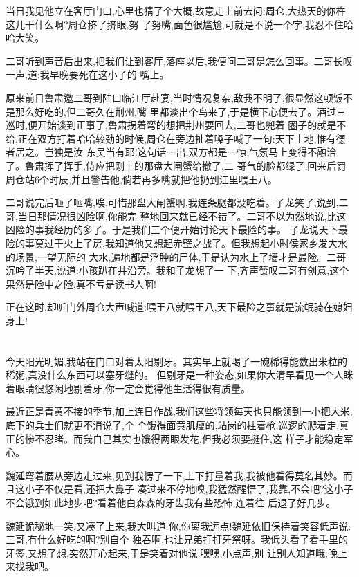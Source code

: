 ﻿\documentclass[12pt,twocolumn]{article}
\begin{document}
当日我见他立在客厅门口,心里也猜了个大概,故意走上前去问:周仓,大热天的你杵这儿干什么啊?周仓挤了挤眼,努
了努嘴,面色很尴尬,可就是不说一个字,我忍不住哈哈大笑。

二哥听到声音后出来,把我们让到客厅,落座以后,我便问二哥是怎么回事。二哥长叹一声,道:我早晚要死在这小子的
嘴上。

原来前日鲁肃邀二哥到陆口临江厅赴宴,当时情况复杂,敌我不明了,很显然这顿饭不是那么好吃的,但二哥久在荆州,嘴
里都淡出个鸟来了,于是横下心便去了。酒过三巡时,便开始谈到正事了,鲁肃拐着弯的想把荆州要回去,二哥也兜着
圈子的就是不给,正在双方打着哈哈较劲的时候,周仓在旁边扯着嗓子喊了一句:天下土地,惟有德者居之。岂独是汝
东吴当有耶!这句话一出,双方都是一惊,气氛马上变得不融洽了。鲁肃挥了挥手,侍应把刚上的那盘大闸蟹给撤了,二
哥气的脸都绿了,回来后罚周仓站6个时辰,并且警告他,倘若再多嘴就把他扔到江里喂王八。

二哥说完后咂了咂嘴,唉,可惜那盘大闸蟹啊,我连条腿都没吃着。子龙笑了,说到,二哥,当日那情况很凶险啊,你能完
整地回来就已经不错了。二哥不以为然地说,比这凶险的事我经历的多了。于是我们三个便开始讨论天下最险的事。
子龙说天下最险的事莫过于火上了房,我知道他又想起赤壁之战了。但我想起小时侯家乡发大水的场景,一望无际的
大水,遍地都是浮肿的尸体,于是认为水上了墙才是最险。二哥沉吟了半天,说道:小孩趴在井沿旁。我和子龙想了一
下,齐声赞叹二哥有创意,这个果然是险中之险,真不亏是读书人啊!

正在这时,却听门外周仓大声喊道:喂王八就喂王八,天下最险之事就是流氓骑在媳妇身上!

\section{}

今天阳光明媚,我站在门口对着太阳剔牙。其实早上就喝了一碗稀得能数出米粒的稀粥,真没什么东西可以塞牙缝的。
但剔牙是一种姿态,如果你大清早看见一个人眯着眼睛很悠闲地剔着牙,你一定会觉得他生活得很有质量。

最近正是青黄不接的季节,加上连日作战,我们这些将领每天也只能领到一小把大米,底下的兵士们就更不消说了,个
个饿得面黄肌瘦的,站岗的拄着枪,巡逻的爬着走,真正的惨不忍睹。而我自己其实也饿得两眼发花,但我必须要挺住,这
样子才能稳定军心。

魏延弯着腰从旁边走过来,见到我愣了一下,上下打量着我,我被他看得莫名其妙。而且这小子不仅是看,还把大鼻子
凑过来不停地嗅,我猛然醒悟了,我靠,不会吧?这小子不会饿到如此地步吧?看着他白森森的牙齿我有些恐怖,连着往
后退了好几步。

魏延诡秘地一笑,又凑了上来,我大叫道:你,你离我远点!魏延依旧保持着笑容低声说:三哥,有什么好吃的啊?别自个
独吞啊,也让兄弟打打牙祭呀。我低头看了看手里的牙签,又想了想,突然开心起来,于是笑着对他说:嘿嘿,小点声,别
让别人知道哦,晚上来找我吧。
\end{document}
